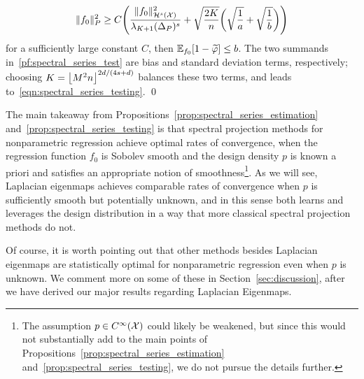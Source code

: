\begin{equation}
\label{pf:spectral_series_test}
\|f_0\|_P^2 \geq C\Biggl(\frac{\|f_0\|_{\mathcal{H}^s(\mathcal{X})}^2}{\lambda_{K + 1}(\Delta_{P})^s} + \sqrt{\frac{2K}{n}}\biggl(\sqrt{\frac{1}{a}} + \sqrt{\frac{1}{b}}\biggr)\Biggr)
\end{equation}
for a sufficiently large constant $C$, then $\mathbb{E}_{f_0}[1 - \widetilde{\varphi}] \leq b$. The two summands in~\eqref{pf:spectral_series_test} are bias and standard deviation terms, respectively; choosing $K = \left\lfloor M^2n \right\rfloor^{2d/(4s + d)}$ balances these two terms, and leads to~\eqref{eqn:spectral_series_testing}. \qed

The main takeaway from Propositions~\ref{prop:spectral_series_estimation} and~\ref{prop:spectral_series_testing} is that spectral projection methods for nonparametric regression achieve optimal rates of convergence, when the regression function $f_0$ is Sobolev smooth and the design density $p$ is known a priori and satisfies an appropriate notion of smoothness\footnote{The assumption $p \in C^{\infty}(\mathcal{X})$ could likely be weakened, but since this would not substantially add to the main points of Propositions~\ref{prop:spectral_series_estimation} and~\ref{prop:spectral_series_testing}, we do not pursue the details further.}. As we will see, Laplacian eigenmaps achieves comparable rates of convergence when $p$ is sufficiently smooth but potentially unknown, and in this sense both learns and leverages the design distribution in a way that more classical spectral projection methods do not.

Of course, it is worth pointing out that other methods besides Laplacian eigenmaps are statistically optimal for nonparametric regression even when $p$ is unknown. We comment more on some of these in Section~\ref{sec:discussion}, after we have derived our major results regarding Laplacian Eigenmaps.